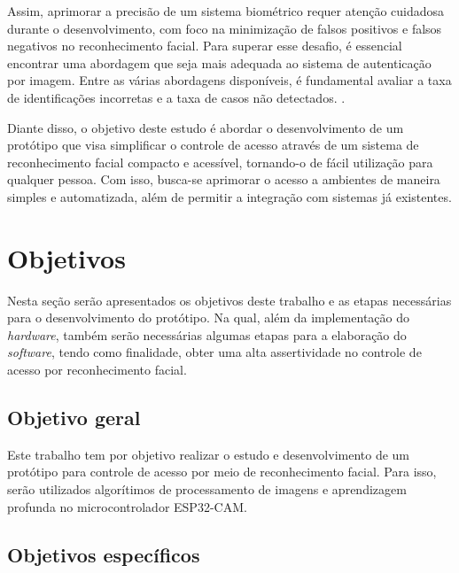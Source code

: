 Assim, aprimorar a precisão de um sistema biométrico requer atenção 
cuidadosa durante o desenvolvimento, com foco na minimização de falsos 
positivos e falsos negativos no reconhecimento facial. Para superar esse 
desafio, é essencial encontrar uma abordagem que seja mais adequada ao 
sistema de autenticação por imagem. Entre as várias abordagens disponíveis, 
é fundamental avaliar a taxa de identificações incorretas e a taxa de 
casos não detectados. \cite{viola2004}.


Diante disso, o objetivo deste estudo é abordar o desenvolvimento de um 
protótipo que visa simplificar o controle de acesso através de um sistema 
de reconhecimento facial compacto e acessível,  tornando-o de fácil 
utilização para qualquer pessoa. Com isso, busca-se aprimorar o acesso a 
ambientes de maneira simples e automatizada, além de permitir a 
integração com sistemas já existentes. 

\section{Objetivos}\label{sec:objetivos}

Nesta seção serão apresentados os objetivos deste trabalho e as etapas necessárias 
para o desenvolvimento do protótipo. Na qual, além da implementação do 
\textit{hardware}, também serão necessárias algumas etapas para a elaboração do \textit{software}, 
tendo como finalidade, obter uma alta assertividade no controle de acesso por 
reconhecimento facial.

\subsection{Objetivo geral}\label{subsec:objetivoGeral}

Este trabalho tem por objetivo realizar o estudo e desenvolvimento de um protótipo 
para controle de acesso por meio de reconhecimento facial. Para isso, 
serão utilizados algorítimos de processamento de imagens e aprendizagem 
profunda no microcontrolador ESP32-CAM.

\subsection{Objetivos específicos}\label{subsec:objetivosEspecificos}

